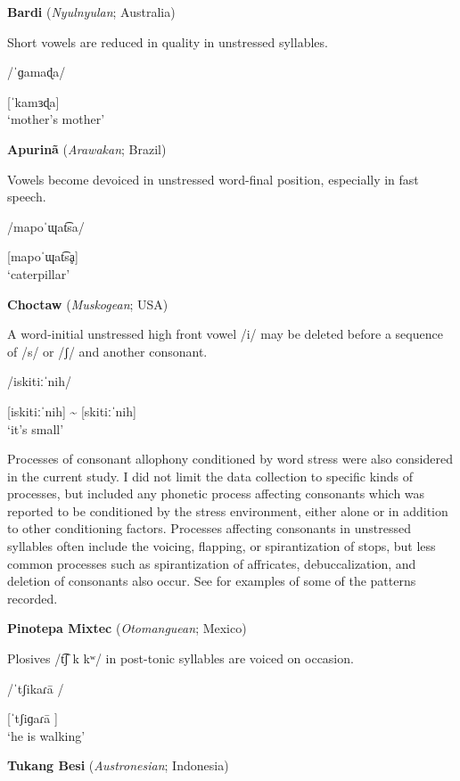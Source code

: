 \ea\label{ex:5.15}
  \textbf{Bardi} (\textit{Nyulnyulan}; Australia)

Short vowels are reduced in quality in unstressed syllables.

/\textsf{ˈ}ɡamaɖa/

[\textsf{ˈ}kamɜɖa]\\
\glt ‘mother’s mother’
\citep[88-90]{Bowern2012}
\z

\ea\label{ex:5.16}
  \textbf{Apurinã} (\textit{Arawakan}; Brazil)

Vowels become devoiced in unstressed word-final position, especially in fast speech.

/mapoˈɰat͡sa/

[mapoˈɰat͡sḁ]\\
\glt ‘caterpillar’
\citep[60-1]{Facundes2000}
\z

\ea\label{ex:5.17}
  \textbf{Choctaw} (\textit{Muskogean}; USA)

A word-initial unstressed high front vowel /i/ may be deleted before a sequence of /s/ or /ʃ/ and another consonant.

/iskitiːˈnih/

[iskitiːˈnih] {\textasciitilde} [skitiːˈnih]\\
\glt ‘it’s small’
\citep[19]{Broadwell2006}
\z

  Processes of consonant allophony conditioned by word stress were also considered in the current study. I did not limit the data collection to specific kinds of processes, but included any phonetic process affecting consonants which was reported to be conditioned by the stress environment, either alone or in addition to other conditioning factors. Processes affecting consonants in unstressed syllables often include the voicing, flapping, or spirantization of stops, but less common processes such as spirantization of affricates, debuccalization, and deletion of consonants also occur. See  for examples of some of the patterns recorded.

\ea\label{ex:5.18}
  \textbf{Pinotepa Mixtec} (\textit{Otomanguean}; Mexico)

Plosives /t͡ʃ k kʷ/ in post-tonic syllables are voiced on occasion.

/ˈtʃikaɾa\={} /

[ˈtʃiɡaɾa\={} ]\\
\glt ‘he is walking’
\citep[5]{Bradley1970}
\z

\ea\label{ex:5.19}
  \textbf{Tukang Besi} (\textit{Austronesian}; Indonesia)

